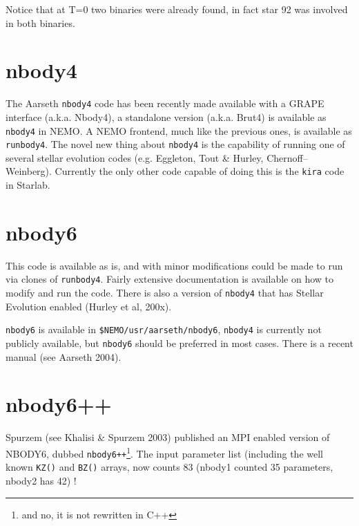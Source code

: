 Notice that at T=0 two binaries were already found, in fact star 92 was
involved in both binaries.


% 
% 
% 

\section{nbody4}

The Aarseth {\tt nbody4} code has been recently made available with a GRAPE
interface (a.k.a. Nbody4), a standalone version  (a.k.a. Brut4) is available
as {\tt nbody4} in NEMO. A NEMO frontend, much like the previous ones, is 
available as {\tt runbody4}. The novel new thing about {\tt nbody4} is the
capability of running one of several stellar evolution codes
(e.g. Eggleton, Tout \& Hurley, Chernoff--Weinberg). Currently the only other
code capable of doing this is the {\tt kira} code in Starlab.

\section{nbody6}

This code is available as is, and with minor modifications could be made to run
via clones of {\tt runbody4}. Fairly extensive documentation is available on how
to modify and run the code.
 There is also a version of {\tt nbody4} that
has Stellar Evolution enabled (Hurley et al, 200x).

{\tt nbody6} is available in {\tt \$NEMO/usr/aarseth/nbody6}, 
{\tt nbody4} is currently not publicly available, but 
{\tt nbody6} should be preferred in most cases. There is a
recent manual (see Aarseth 2004).


\section{nbody6++}

Spurzem (see Khalisi \& Spurzem 2003) published an MPI enabled version
of NBODY6, dubbed {\tt nbody6++}\footnote{and no, it is not rewritten in C++}.
The input parameter list (including the well known {\tt KZ()} and {\tt BZ()}
arrays, now counts 83  (nbody1 counted 35 parameters, nbody2 has 42) !

